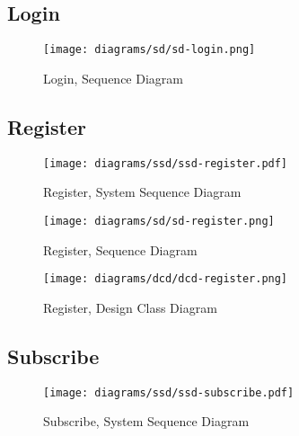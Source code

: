 \subsection{Login}
\label{subsec:login}
\begin{figure}[H]
    \texttt{[image: diagrams/sd/sd-login.png]}
    \caption{Login, Sequence Diagram}
    \label{fig:login-sd}
\end{figure}
\newpage

\subsection{Register}
\label{subsec:register}
\begin{figure}[H]
    \texttt{[image: diagrams/ssd/ssd-register.pdf]}
    \caption{Register, System Sequence Diagram}
    \label{fig:register-ssd}
\end{figure}
\begin{figure}[H]
    \texttt{[image: diagrams/sd/sd-register.png]}
    \caption{Register, Sequence Diagram}
    \label{fig:register-sd}
\end{figure}
\newpage
\begin{figure}[H]
    \texttt{[image: diagrams/dcd/dcd-register.png]}
    \caption{Register, Design Class Diagram}
    \label{fig:register-dcd}
\end{figure}
\newpage

\subsection{Subscribe}
\label{subsec:subscribe}
\begin{figure}[H]
    \texttt{[image: diagrams/ssd/ssd-subscribe.pdf]}
    \caption{Subscribe, System Sequence Diagram}
    \label{fig:subscribe-ssd}
\end{figure}
\newpage

